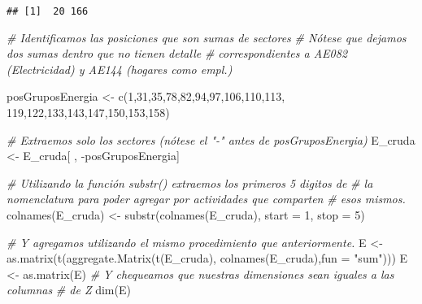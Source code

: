 \documentclass[
]{article}
\newenvironment{Shaded}{\begin{snugshade}}{\end{snugshade}}
\newcommand{\AttributeTok}[1]{\textcolor[rgb]{0.77,0.63,0.00}{#1}}
\newcommand{\CommentTok}[1]{\textcolor[rgb]{0.56,0.35,0.01}{\textit{#1}}}
\newcommand{\DecValTok}[1]{\textcolor[rgb]{0.00,0.00,0.81}{#1}}
\newcommand{\FunctionTok}[1]{\textcolor[rgb]{0.00,0.00,0.00}{#1}}
\newcommand{\NormalTok}[1]{#1}
\newcommand{\OtherTok}[1]{\textcolor[rgb]{0.56,0.35,0.01}{#1}}
\newcommand{\SpecialCharTok}[1]{\textcolor[rgb]{0.00,0.00,0.00}{#1}}
\newcommand{\StringTok}[1]{\textcolor[rgb]{0.31,0.60,0.02}{#1}}
\begin{document}
\begin{verbatim}
## [1]  20 166
\end{verbatim}

\begin{Shaded}
\begin{Highlighting}[]
\CommentTok{\# Identificamos las posiciones que son sumas de sectores}
\CommentTok{\# Nótese que dejamos dos sumas dentro que no tienen detalle}
\CommentTok{\# correspondientes a AE082 (Electricidad) y AE144 (hogares como empl.)}

\NormalTok{posGruposEnergia }\OtherTok{\textless{}{-}} \FunctionTok{c}\NormalTok{(}\DecValTok{1}\NormalTok{,}\DecValTok{31}\NormalTok{,}\DecValTok{35}\NormalTok{,}\DecValTok{78}\NormalTok{,}\DecValTok{82}\NormalTok{,}\DecValTok{94}\NormalTok{,}\DecValTok{97}\NormalTok{,}\DecValTok{106}\NormalTok{,}\DecValTok{110}\NormalTok{,}\DecValTok{113}\NormalTok{,}
                      \DecValTok{119}\NormalTok{,}\DecValTok{122}\NormalTok{,}\DecValTok{133}\NormalTok{,}\DecValTok{143}\NormalTok{,}\DecValTok{147}\NormalTok{,}\DecValTok{150}\NormalTok{,}\DecValTok{153}\NormalTok{,}\DecValTok{158}\NormalTok{)}

\CommentTok{\# Extraemos solo los sectores (nótese el "{-}" antes de posGruposEnergia)}
\NormalTok{E\_cruda }\OtherTok{\textless{}{-}}\NormalTok{ E\_cruda[ , }\SpecialCharTok{{-}}\NormalTok{posGruposEnergia]}

\CommentTok{\# Utilizando la función substr() extraemos los primeros 5 digitos de}
\CommentTok{\# la nomenclatura para poder agregar por actividades que comparten}
\CommentTok{\# esos mismos.}
\FunctionTok{colnames}\NormalTok{(E\_cruda) }\OtherTok{\textless{}{-}} \FunctionTok{substr}\NormalTok{(}\FunctionTok{colnames}\NormalTok{(E\_cruda), }\AttributeTok{start =} \DecValTok{1}\NormalTok{, }\AttributeTok{stop =} \DecValTok{5}\NormalTok{)}

\CommentTok{\# Y agregamos utilizando el mismo procedimiento que anteriormente.}
\NormalTok{E }\OtherTok{\textless{}{-}} \FunctionTok{as.matrix}\NormalTok{(}\FunctionTok{t}\NormalTok{(}\FunctionTok{aggregate.Matrix}\NormalTok{(}\FunctionTok{t}\NormalTok{(E\_cruda), }\FunctionTok{colnames}\NormalTok{(E\_cruda),}\AttributeTok{fun =} \StringTok{"sum"}\NormalTok{)))}
\NormalTok{E }\OtherTok{\textless{}{-}} \FunctionTok{as.matrix}\NormalTok{(E)}
\CommentTok{\# Y chequeamos que nuestras dimensiones sean iguales a las columnas}
\CommentTok{\# de Z}
\FunctionTok{dim}\NormalTok{(E)}
\end{Highlighting}
\end{Shaded}
\end{document}

